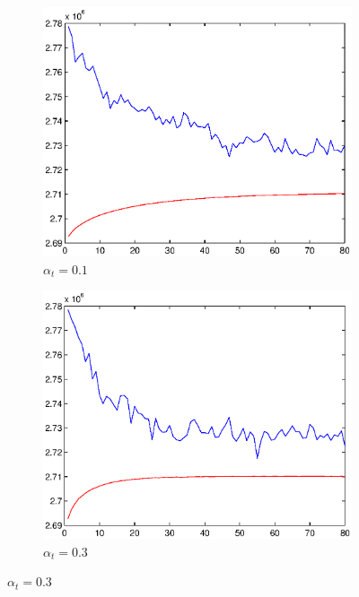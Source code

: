 \documentclass{article}
\begin{document}
\begin{figure}
    \centering
    \begin{subfigure}[t]{0.7\textwidth}
            \centering
            \includegraphics[width=\textwidth]{constant_0_1_convergence.eps}
            \caption{$\alpha_t = 0.1$}
    \end{subfigure}
    \begin{subfigure}[t]{0.7\textwidth}
            \centering
            \includegraphics[width=\textwidth]{constant_0_3_convergence.eps}
            \caption{$\alpha_t = 0.3$}
    \end{subfigure}

\end{figure}
\end{document}
